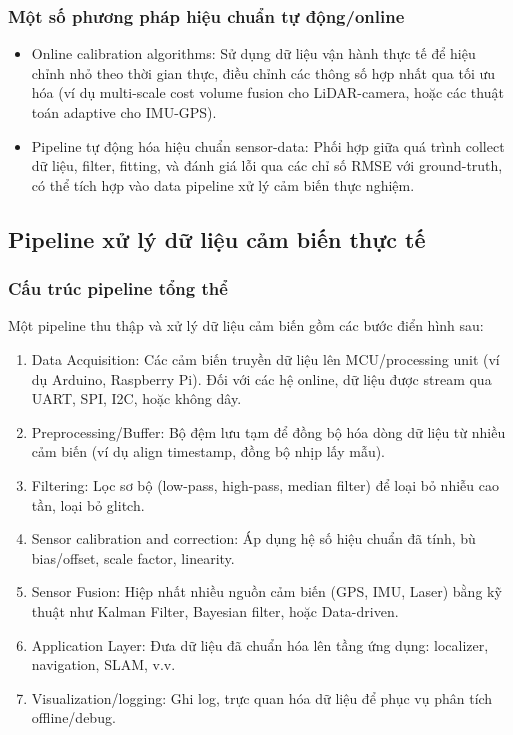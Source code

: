 \subsubsection{Một số phương pháp hiệu chuẩn tự động/online}
\begin{itemize}
    \item Online calibration algorithms: Sử dụng dữ liệu vận hành thực tế để hiệu chỉnh nhỏ theo thời gian thực, điều chỉnh các thông số hợp nhất qua tối ưu hóa (ví dụ multi-scale cost volume fusion cho LiDAR-camera, hoặc các thuật toán adaptive cho IMU-GPS).
    \item Pipeline tự động hóa hiệu chuẩn sensor-data: Phối hợp giữa quá trình collect dữ liệu, filter, fitting, và đánh giá lỗi qua các chỉ số RMSE với ground-truth, có thể tích hợp vào data pipeline xử lý cảm biến thực nghiệm.
\end{itemize}
\subsection{Pipeline xử lý dữ liệu cảm biến thực tế}
\subsubsection{Cấu trúc pipeline tổng thể}
Một pipeline thu thập và xử lý dữ liệu cảm biến gồm các bước điển hình sau:
\begin{enumerate}
    \item Data Acquisition: Các cảm biến truyền dữ liệu lên MCU/processing unit (ví dụ Arduino, Raspberry Pi). Đối với các hệ online, dữ liệu được stream qua UART, SPI, I2C, hoặc không dây.
    \item Preprocessing/Buffer: Bộ đệm lưu tạm để đồng bộ hóa dòng dữ liệu từ nhiều cảm biến (ví dụ align timestamp, đồng bộ nhịp lấy mẫu).
    \item Filtering: Lọc sơ bộ (low-pass, high-pass, median filter) để loại bỏ nhiễu cao tần, loại bỏ glitch.
    \item Sensor calibration and correction: Áp dụng hệ số hiệu chuẩn đã tính, bù bias/offset, scale factor, linearity.
    \item Sensor Fusion: Hiệp nhất nhiều nguồn cảm biến (GPS, IMU, Laser) bằng kỹ thuật như Kalman Filter, Bayesian filter, hoặc Data-driven.
    \item Application Layer: Đưa dữ liệu đã chuẩn hóa lên tầng ứng dụng: localizer, navigation, SLAM, v.v.
    \item Visualization/logging: Ghi log, trực quan hóa dữ liệu để phục vụ phân tích offline/debug.
\end{enumerate}
